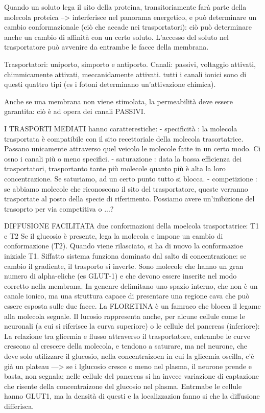\documentclass[a4paper,12pt]{article}
\begin{document}
Quando un soluto lega il sito della proteina, transitoriamente farà parte della molecola proteica --> interferisce nel panorama energetico, e può determinare un cambio conformazionale (ciò che accade nei trasportatori): ciò può determinare anche un cambio di affinità con un certo soluto.
L'accesso del soluto nel trasportatore può avvenire da entrambe le facce della membrana.

Trasportatori: uniporto, simporto e antiporto.
Canali: passivi, voltaggio attivati, chimmicamente attivati, meccanidamente attivati. tutti i canali ionici sono di questi quattro tipi (es i fotoni determinano un'attivazione chimica).

Anche se una membrana non viene stimolata, la permeabilità deve essere garantita: ciò è ad opera dei canali PASSIVI.

I TRASPORTI MEDIATI hanno caratterestiche:
- specificità : la molecola trasportata è compatibile con il sito recettoriale della molecola trasortatrice. Passano unicamente attraverso quel veicolo le molecole fatte in un certo modo. Ci osno i canali più o meno specifici.
- saturazione :  data la bassa efficienza dei trasportatori, trasportanto tante più molecole quanto più è alta la loro concentrazione. Se saturiamo, ad un certo punto tutto si blocca.
- competizione : se abbiamo molecole che riconoscono il sito del trasportatore, queste verranno trasportate al posto della specie di riferimento. Possiamo avere un'inibizione del trasoprto per via competitiva o ...?

DIFFUSIONE FACILITATA
due conformazioni della moelcola trasportatrice: T1 e T2
Se il glucosio è presente, lega la molecola e impone un cambio di conformazione (T2). Quando viene rilasciato, si ha di nuovo la conformazioe iniziale T1. Siffatto sistema funziona dominato dal salto di concentrazione: se cambio il gradiente, il trasporto si inverte.
Sono molecole che hanno un gran numero di alpha-eliche (es GLUT-1) e che devono essere inserite nel modo corretto nella membrana. In genenre delimitano uno spazio interno, che non è un canale ionico, ma una struttura capace di presentare una regione cava che può essere esposta sulle due facce. La FLORETINA è un famraco che blocca il legame alla molecola segnale.
Il lucosio rappresenta anche, per alcune cellule come le neuronali (a cui si riferisce la curva superiore) o le cellule del pancreas (inferiore):
La relazione tra glicemia e flusso attraverso il trasportatore, entrambe le curve crescono al crescere della molecola, e tendono a saturare, ma nel neurone, che deve solo utilizzare il glucosio, nella concentraizoen in cui la glicemia oscilla, c'è già un plateau ---> se i lglucosio cresce o meno nel plasma, il neurone prende e basta, non segnala; nelle cellule del pancreas si ha invece variazione di captazione che risente della concentraizone del glucosio nel plasma.
Entrmabe le cellule hanno GLUT1, ma la densità di questi e la localizzazion fanno si che la diffusione differisca.
\end{document}
